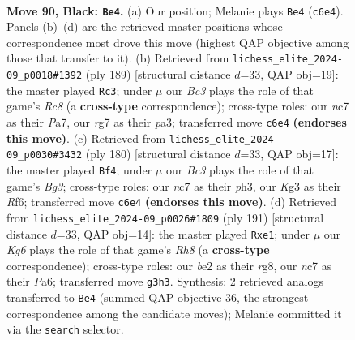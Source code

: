 \documentclass[11pt]{article}
\begin{document}
\clearpage

\begin{figure}[p]\centering
\begin{subfigure}{0.46\textwidth}\centering
\resizebox{\linewidth}{!}{%
\newchessgame
\chessboard[
  setfen={8/2N3R1/2b5/5P2/np4P1/6k1/4B3/6K1 b - - 3 90},
  showmover=false,
  pgfstyle=straightmove, color=movearrow, markmove={c6-e4}
]}
\caption{}
\end{subfigure}\hfill
\begin{subfigure}{0.46\textwidth}\centering
\resizebox{\linewidth}{!}{%
\newchessgame
\chessboard[
  setfen={8/p4k2/2P2P2/3K4/8/P7/5R2/2r5 b - - 0 95},
  showmover=false,
  pgfstyle=straightmove, color=movearrow, markmove={c1-c3}
]}
\caption{}
\end{subfigure}
\\[4pt]
\begin{subfigure}{0.46\textwidth}\centering
\resizebox{\linewidth}{!}{%
\newchessgame
\chessboard[
  setfen={8/3k4/5R2/1r3p2/6p1/6Bp/8/6K1 w - - 78 91},
  showmover=false,
  pgfstyle=straightmove, color=movearrow, markmove={g3-f4}
]}
\caption{}
\end{subfigure}\hfill
\begin{subfigure}{0.46\textwidth}\centering
\resizebox{\linewidth}{!}{%
\newchessgame
\chessboard[
  setfen={6R1/8/p4b2/3k1b2/p7/2P2K2/1P6/4B2r b - - 0 96},
  showmover=false,
  pgfstyle=straightmove, color=movearrow, markmove={h1-e1}
]}
\caption{}
\end{subfigure}
\caption{\textbf{Move 90, Black: \texttt{Be4}.} (a) Our position; Melanie plays \texttt{Be4} (\texttt{c6e4}). Panels (b)--(d) are the retrieved master positions whose correspondence most drove this move (highest QAP objective among those that transfer to it). (b) Retrieved from \texttt{lichess\_elite\_2024-09\_p0018\#1392} (ply 189) [structural distance $d$=33, QAP obj=19]: the master played \texttt{Rc3}; under $\mu$ our \emph{Bc3} plays the role of that game's \emph{Rc8} (a \textbf{cross-type} correspondence); cross-type roles: our \emph{n}c7 as their \emph{P}a7, our \emph{r}g7 as their \emph{p}a3; transferred move \texttt{c6e4} \textbf{(endorses this move)}. (c) Retrieved from \texttt{lichess\_elite\_2024-09\_p0030\#3432} (ply 180) [structural distance $d$=33, QAP obj=17]: the master played \texttt{Bf4}; under $\mu$ our \emph{Bc3} plays the role of that game's \emph{Bg3}; cross-type roles: our \emph{n}c7 as their \emph{p}h3, our \emph{K}g3 as their \emph{R}f6; transferred move \texttt{c6e4} \textbf{(endorses this move)}. (d) Retrieved from \texttt{lichess\_elite\_2024-09\_p0026\#1809} (ply 191) [structural distance $d$=33, QAP obj=14]: the master played \texttt{Rxe1}; under $\mu$ our \emph{Kg6} plays the role of that game's \emph{Rh8} (a \textbf{cross-type} correspondence); cross-type roles: our \emph{b}e2 as their \emph{r}g8, our \emph{n}c7 as their \emph{P}a6; transferred move \texttt{g3h3}. Synthesis: 2 retrieved analogs transferred to \texttt{Be4} (summed QAP objective 36, the strongest correspondence among the candidate moves); Melanie committed it via the \texttt{search} selector.}
\label{fig:thought-m179}
\end{figure}
\end{document}
